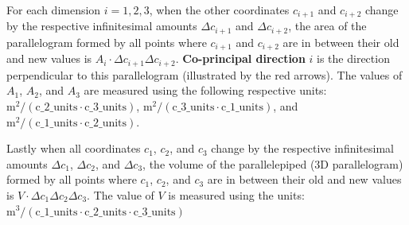 For each dimension \(i = 1, 2, 3\), when the other coordinates \(c_{i+1}\) and \(c_{i+2}\) change by the respective infinitesimal amounts \(\Delta c_{i+1}\) and \(\Delta c_{i+2}\), the area of the parallelogram formed by all points where \(c_{i+1}\) and \(c_{i+2}\) are in between their old and new values is \(A_i \cdot \Delta c_{i+1} \Delta c_{i+2}\). {\bf Co-principal direction} \(i\) is the direction perpendicular to this parallelogram (illustrated by the red arrows). The values of \(A_1\), \(A_2\), and \(A_3\) are measured using the following respective units: \(\text{m}^2/(\text{c\_2\_units} \cdot \text{c\_3\_units})\), \(\text{m}^2/(\text{c\_3\_units} \cdot \text{c\_1\_units})\), and \(\text{m}^2/(\text{c\_1\_units} \cdot \text{c\_2\_units})\).     

Lastly when all coordinates \(c_1\), \(c_2\), and \(c_3\) change by the respective infinitesimal amounts \(\Delta c_1\), \(\Delta c_2\), and \(\Delta c_3\), the volume of the parallelepiped (3D parallelogram) formed by all points where \(c_1\), \(c_2\), and \(c_3\) are in between their old and new values is \(V \cdot \Delta c_1 \Delta c_2 \Delta c_3\). The value of \(V\) is measured using the units: \(\text{m}^3/(\text{c\_1\_units} \cdot \text{c\_2\_units} \cdot \text{c\_3\_units})\) 

